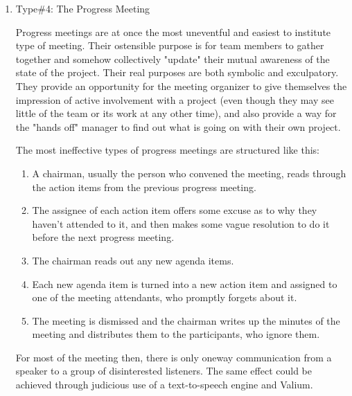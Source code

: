 \documentclass{article}
\begin{document}
\begin{enumerate}
\begin{enumerate}
\item Type\#4: The Progress Meeting
\label{sec:orgheadline184}

Progress meetings are at once the most uneventful and easiest to
institute type of meeting. Their ostensible purpose is for team members
to gather together and somehow collectively "update" their mutual
awareness of the state of the project. Their real purposes are both
symbolic and exculpatory. They provide an opportunity for the meeting
organizer to give themselves the impression of active involvement with a
project (even though they may see little of the team or its work at any
other time), and also provide a way for the "hands off" manager to find
out what is going on with their own project.

The most ineffective types of progress meetings are structured like
this:

\begin{enumerate}
\item A chairman, usually the person who convened the meeting, reads
through the action items from the previous progress meeting.\\
\item The assignee of each action item offers some excuse as to why they
haven't attended to it, and then makes some vague resolution to do it
before the next progress meeting.\\
\item The chairman reads out any new agenda items.
\item Each new agenda item is turned into a new action item and assigned to
one of the meeting attendants, who promptly forgets about it.\\
\item The meeting is dismissed and the chairman writes up the minutes of
the meeting and distributes them to the participants, who ignore
them.
\end{enumerate}

For most of the meeting then, there is only oneway communication from a
speaker to a group of disinterested listeners. The same effect could be
achieved through judicious use of a text-to-speech engine and Valium.


\end{enumerate}
\end{enumerate}
\end{document}
